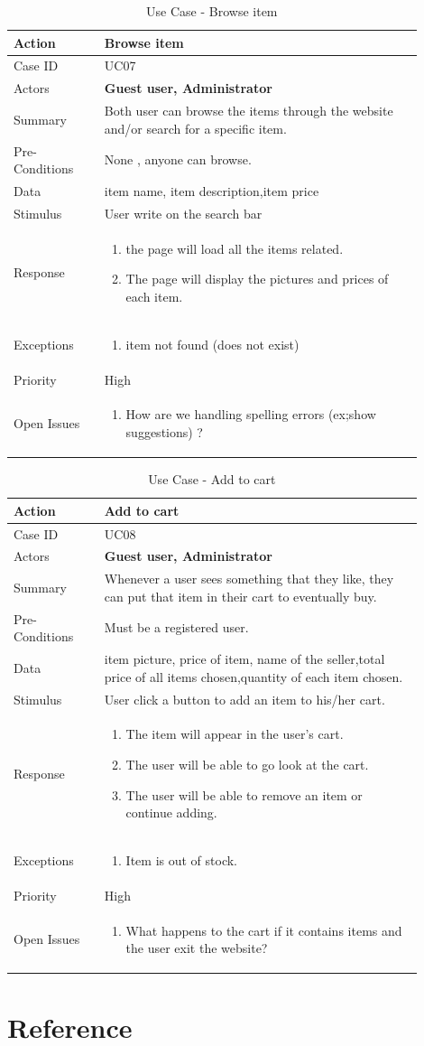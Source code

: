 \documentclass[11pt]{article}
\newcounter{use case ID}
\newcommand\tabularhead[1]{
    \begin{table}[ht]
        \addtocounter{use case ID}{1}
        \caption{Use Case \arabic{use case ID} - #1}
        \vspace{0.2cm}
        \begin{tabular}{|p{0.2\linewidth}|p{0.70\linewidth}|}
            \hline
            \textbf{Action} & \textbf{#1} \\
            \hline}
\newcommand\addrow[2]{#1 & #2\\ \hline}
\newcommand\addmulrow[2]{ \begin{minipage}[t][][t]{2.5cm}#1\end{minipage}
                &\begin{minipage}[t][][t]{11cm}
                    \begin{enumerate}[itemsep=-1ex] #2   \end{enumerate}
                \end{minipage}\vfill\\ \hline}
\newenvironment{usecase}{\tabularhead}
        {\hline\end{tabular}\end{table}}
\begin{document}
\begin{usecase}{Browse item}
    \addrow{Case ID}{UC07}
    \addrow{Actors}{\textbf{Guest user, Administrator}}
    \addrow{Summary}{Both user can browse the items through the website and/or search for a specific item.}
    \addrow{Pre-Conditions}{
       None , anyone can browse.
        }
    \addrow{Data}{
    item name, item description,item price}
    \addrow{Stimulus}{User write on the search bar}
    \addmulrow{Response}{
        \item the page will load all the items related.
        \item The page will display the pictures and prices of each item.
    }
    \addmulrow{Exceptions}{
        \item item not found (does not exist) 
    }
    \addrow{Priority}{High}
    \addmulrow{Open Issues}{
        \item How are we handling spelling errors (ex;show suggestions) ?
    }
\end{usecase}



\begin{usecase}{Add to cart}
    \addrow{Case ID}{UC08}
    \addrow{Actors}{\textbf{Guest user, Administrator}}
    \addrow{Summary}{Whenever a user sees something that they like, they can put that item in their cart to eventually buy.}
    \addrow{Pre-Conditions}{
       Must be a registered user.
        }
    \addrow{Data}{
item picture, price of item, name of the seller,total price of all items chosen,quantity of each item chosen.}
    \addrow{Stimulus}{User click a button to add an item to his/her cart.}
    \addmulrow{Response}{
        \item The item will appear in the user's cart.
        \item The user will be able to go look at the cart.
        \item The user will be able to remove an item or continue adding.
    }
    \addmulrow{Exceptions}{
        \item Item is out of stock.
    }
    \addrow{Priority}{High}
    \addmulrow{Open Issues}{
        \item What happens to the cart if it contains items and the user exit the website?
    }
\end{usecase}
\clearpage


\section{Reference}
\end{document}
